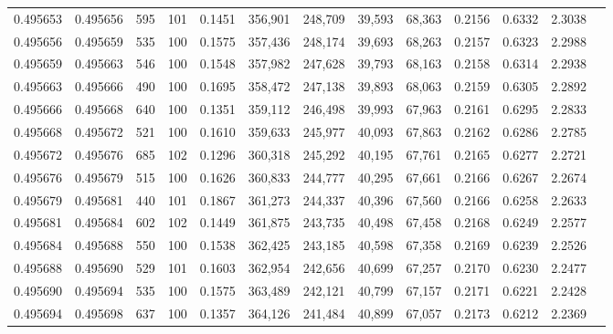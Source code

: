 \begin{tabular}{rrrrrrrrrrrrr}
0.495653 & 0.495656 &   595 & 101 &                                     0.1451 & 356,901 & 248,709 &  39,593 &  68,363 & 0.2156 & 0.6332 & 2.3038 \\
0.495656 & 0.495659 &   535 & 100 &                                     0.1575 & 357,436 & 248,174 &  39,693 &  68,263 & 0.2157 & 0.6323 & 2.2988 \\
0.495659 & 0.495663 &   546 & 100 &                                     0.1548 & 357,982 & 247,628 &  39,793 &  68,163 & 0.2158 & 0.6314 & 2.2938 \\
0.495663 & 0.495666 &   490 & 100 &                                     0.1695 & 358,472 & 247,138 &  39,893 &  68,063 & 0.2159 & 0.6305 & 2.2892 \\
0.495666 & 0.495668 &   640 & 100 &                                     0.1351 & 359,112 & 246,498 &  39,993 &  67,963 & 0.2161 & 0.6295 & 2.2833 \\
0.495668 & 0.495672 &   521 & 100 &                                     0.1610 & 359,633 & 245,977 &  40,093 &  67,863 & 0.2162 & 0.6286 & 2.2785 \\
0.495672 & 0.495676 &   685 & 102 &                                     0.1296 & 360,318 & 245,292 &  40,195 &  67,761 & 0.2165 & 0.6277 & 2.2721 \\
0.495676 & 0.495679 &   515 & 100 &                                     0.1626 & 360,833 & 244,777 &  40,295 &  67,661 & 0.2166 & 0.6267 & 2.2674 \\
0.495679 & 0.495681 &   440 & 101 &                                     0.1867 & 361,273 & 244,337 &  40,396 &  67,560 & 0.2166 & 0.6258 & 2.2633 \\
0.495681 & 0.495684 &   602 & 102 &                                     0.1449 & 361,875 & 243,735 &  40,498 &  67,458 & 0.2168 & 0.6249 & 2.2577 \\
0.495684 & 0.495688 &   550 & 100 &                                     0.1538 & 362,425 & 243,185 &  40,598 &  67,358 & 0.2169 & 0.6239 & 2.2526 \\
0.495688 & 0.495690 &   529 & 101 &                                     0.1603 & 362,954 & 242,656 &  40,699 &  67,257 & 0.2170 & 0.6230 & 2.2477 \\
0.495690 & 0.495694 &   535 & 100 &                                     0.1575 & 363,489 & 242,121 &  40,799 &  67,157 & 0.2171 & 0.6221 & 2.2428 \\
0.495694 & 0.495698 &   637 & 100 &                                     0.1357 & 364,126 & 241,484 &  40,899 &  67,057 & 0.2173 & 0.6212 & 2.2369 \\

\end{tabular}
